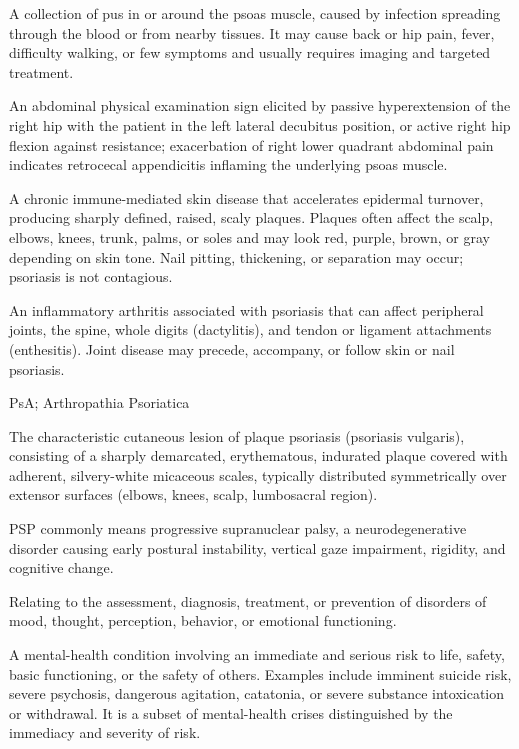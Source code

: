  A collection of pus in or around the psoas muscle, caused by infection spreading through the blood or from nearby tissues.
It may cause back or hip pain, fever, difficulty walking, or few symptoms and usually
requires imaging and targeted treatment.

 An abdominal physical examination sign elicited by passive hyperextension of the right hip with the patient in the left lateral decubitus position, or active right hip flexion against resistance; exacerbation of right lower quadrant abdominal pain indicates retrocecal appendicitis inflaming the underlying psoas muscle.

 A chronic immune-mediated skin disease that accelerates epidermal turnover, producing sharply defined, raised, scaly plaques. Plaques often affect the scalp, elbows, knees, trunk, palms, or soles and may look red, purple, brown, or gray depending on skin tone. Nail pitting, thickening, or separation may occur; psoriasis is not contagious.

 An inflammatory arthritis associated with psoriasis that can affect peripheral joints, the spine, whole digits (dactylitis), and tendon or ligament attachments (enthesitis). Joint disease may precede, accompany, or follow skin or nail psoriasis.

\synonyms
PsA; Arthropathia Psoriatica

 The characteristic cutaneous lesion of plaque psoriasis (psoriasis vulgaris), consisting of a sharply demarcated, erythematous, indurated plaque covered with adherent, silvery-white micaceous scales, typically distributed symmetrically over extensor surfaces (elbows, knees, scalp, lumbosacral region).

 PSP commonly means progressive supranuclear palsy, a neurodegenerative disorder causing early postural instability, vertical gaze impairment, rigidity, and cognitive change.

 Relating to the assessment, diagnosis, treatment, or prevention of disorders of mood, thought, perception, behavior, or emotional functioning.

 A mental-health condition involving an immediate and serious risk to life, safety, basic functioning, or the safety of others. Examples include imminent suicide risk, severe psychosis, dangerous agitation, catatonia, or severe substance intoxication or withdrawal. It is a subset of mental-health crises distinguished by the immediacy and severity of risk.


